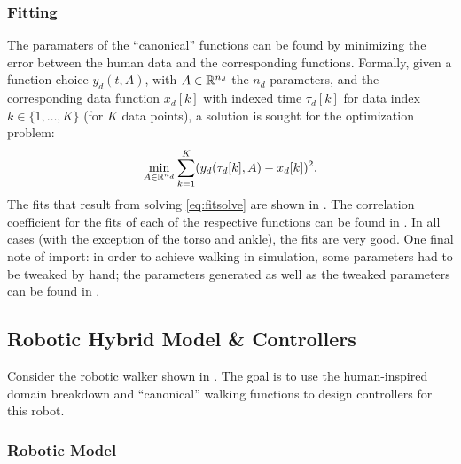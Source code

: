 \subsubsection{Fitting}
The paramaters of the ``canonical'' functions can be found by minimizing the
error between the human data and the corresponding functions.
%
Formally, given a function choice $y_d(t, A)$, with $A \in \mathbb{R}^{n_{d}}$ the $n_d$
parameters, and the corresponding data function $x_{d}[k]$ with indexed time
$\tau_{d}[k]$ for data index $k \in \{1, \ldots, K\}$ (for $K$ data points), a
solution is sought for the optimization problem:
%
\begin{align}
  \label{eq:fitsolve}
  \min_{A \in \mathbb{R}^{n_{d}}} \sum_{k=1}^{K} (y_{d}(\tau_{d}[k], A) - x_{d}[k])^2.
\end{align}
%
The fits that result from solving \eqref{eq:fitsolve} are shown in
.
%
The correlation coefficient for the fits of each of the respective functions can
be found in .
%
In all cases (with the exception of the torso and ankle), the fits are very
good.
%
One final note of import:
%
in order to achieve walking in simulation, some parameters had to be tweaked by
hand;
%
the parameters generated as well as the tweaked parameters can be found in
.




\subsection{Robotic Hybrid Model \& Controllers}

Consider the robotic walker shown in .
%
The goal is to use the human-inspired domain breakdown and ``canonical'' walking
functions to design controllers for this robot.

\subsubsection{Robotic Model}


